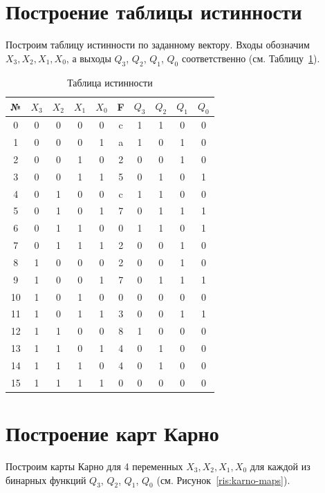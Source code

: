 \section{Построение таблицы истинности}
Построим таблицу истинности по заданному вектору. Входы обозначим $X_3, X_2, X_1, X_0$, а выходы $Q_3$,  $Q_2$, $Q_1$,  $Q_0$ соответственно (см. Таблицу~\ref{tab:func-table}).

\begin{table}[htbp]
	\small
	\centering
	\caption{Таблица истинности}
		\begin{tabular}{|c||c|c|c|c||c||c|c|c|c|}
			\hline
			№ & $X_3$ & $X_2$ & $X_1$ & $X_0$ & F & $Q_3$ & $Q_2$ & $Q_1$ & $Q_0$ \\ \hline \hline
			0 & 0 & 0 & 0 & 0 & c & 1 & 1 & 0 & 0 \\ \hline
			1 & 0 & 0 & 0 & 1 & a & 1 & 0 & 1 & 0 \\ \hline
			2 & 0 & 0 & 1 & 0 & 2 & 0 & 0 & 1 & 0 \\ \hline
			3 & 0 & 0 & 1 & 1 & 5 & 0 & 1 & 0 & 1 \\ \hline
			4 & 0 & 1 & 0 & 0 & c & 1 & 1 & 0 & 0 \\ \hline
			5 & 0 & 1 & 0 & 1 & 7 & 0 & 1 & 1 & 1 \\ \hline
			6 & 0 & 1 & 1 & 0 & 0 & 1 & 1 & 0 & 1 \\ \hline
			7 & 0 & 1 & 1 & 1 & 2 & 0 & 0 & 1 & 0 \\ \hline
			8 & 1 & 0 & 0 & 0 & 2 & 0 & 0 & 1 & 0 \\ \hline
			9 & 1 & 0 & 0 & 1 & 7 & 0 & 1 & 1 & 1 \\ \hline
			10 & 1 & 0 & 1 & 0 & 0 & 0 & 0 & 0 & 0 \\ \hline
			11 & 1 & 0 & 1 & 1 & 3 & 0 & 0 & 1 & 1 \\ \hline
			12 & 1 & 1 & 0 & 0 & 8 & 1 & 0 & 0 & 0 \\ \hline
			13 & 1 & 1 & 0 & 1 & 4 & 0 & 1 & 0 & 0 \\ \hline
			14 & 1 & 1 & 1 & 0 & 4 & 0 & 1 & 0 & 0 \\ \hline
			15 & 1 & 1 & 1 & 1 & 0 & 0 & 0 & 0 & 0 \\ \hline
		\end{tabular}
	\label{tab:func-table}
\end{table}

\section{Построение карт Карно}
Построим карты Карно для 4 переменных $X_3, X_2, X_1, X_0$ для каждой из бинарных функций $Q_3$,  $Q_2$, $Q_1$,  $Q_0$ (см. Рисунок~\ref{ris:karno-maps}).

